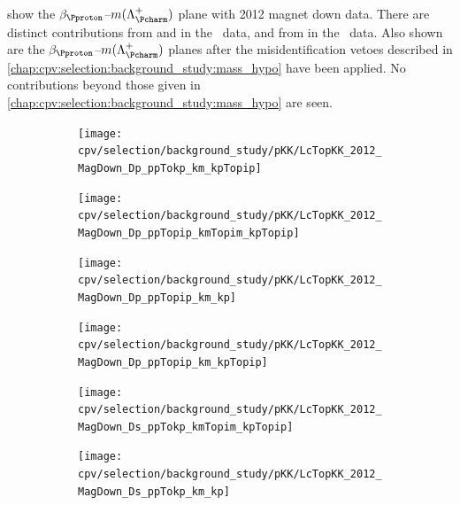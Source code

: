 show the $\beta_{\Pproton}$--$m(\PLambdac)$ plane with 2012 magnet down data.
There are distinct contributions from \decay{\PDplus}{\PKplus\PKminus\Ppiplus}
and \decay{\PDsplus}{\PKplus\PKminus\Ppiplus} in the \pKK\ data, and from
\decay{\PDsplus}{\PKplus\Ppiminus\Ppiplus} in the \ppipi\ data.
Also shown are the $\beta_{\Pproton}$--$m(\PLambdac)$ planes after the
misidentification vetoes described in
\cref{chap:cpv:selection:background_study:mass_hypo} have been applied.
No contributions beyond those given in
\cref{chap:cpv:selection:background_study:mass_hypo} are seen.

\begin{figure}
  \begin{subfigure}[b]{0.3\textwidth}
    \texttt{[image: cpv/selection/background\_study/pKK/LcTopKK\_2012\_MagDown\_Dp\_ppTokp\_km\_kpTopip]}
    \caption{\decay{\PDplus}{\PKplus\PKminus\Ppiplus}}
    \label{fig:cpv:selection:background_study:pKK_meson:dplus_kkpi}
  \end{subfigure}
  \begin{subfigure}[b]{0.3\textwidth}
    \texttt{[image: cpv/selection/background\_study/pKK/LcTopKK\_2012\_MagDown\_Dp\_ppTopip\_kmTopim\_kpTopip]}
    \caption{\decay{\PDplus}{\Ppiplus\Ppiminus\Ppiplus}}
    \label{fig:cpv:selection:background_study:pKK_meson:dplus_pipipi}
  \end{subfigure}
  \begin{subfigure}[b]{0.3\textwidth}
    \texttt{[image: cpv/selection/background\_study/pKK/LcTopKK\_2012\_MagDown\_Dp\_ppTopip\_km\_kp]}
    \caption{\decay{\PDplus}{\Ppiplus\PKminus\PKplus}}
    \label{fig:cpv:selection:background_study:pKK_meson:dplus_pikk}
  \end{subfigure}

  \begin{subfigure}[b]{0.3\textwidth}
    \texttt{[image: cpv/selection/background\_study/pKK/LcTopKK\_2012\_MagDown\_Dp\_ppTopip\_km\_kpTopip]}
    \caption{\decay{\PDplus}{\Ppiplus\PKminus\Ppiplus}}
    \label{fig:cpv:selection:background_study:pKK_meson:dplus_pikpi}
  \end{subfigure}
  \begin{subfigure}[b]{0.3\textwidth}
    \texttt{[image: cpv/selection/background\_study/pKK/LcTopKK\_2012\_MagDown\_Ds\_ppTokp\_kmTopim\_kpTopip]}
    \caption{\decay{\PDsplus}{\PKplus\Ppiminus\Ppiplus}}
    \label{fig:cpv:selection:background_study:pKK_meson:dsplus_Kpipi}
  \end{subfigure}
  \begin{subfigure}[b]{0.3\textwidth}
    \texttt{[image: cpv/selection/background\_study/pKK/LcTopKK\_2012\_MagDown\_Ds\_ppTokp\_km\_kp]}
    \caption{\decay{\PDsplus}{\PKplus\PKminus\PKplus}}
    \label{fig:cpv:selection:background_study:pKK_meson:dsplus_KKK}
  \end{subfigure}


\end{figure}
